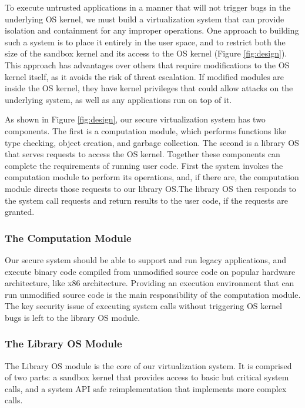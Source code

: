 {To execute untrusted applications in a manner that will not trigger bugs
in the underlying OS kernel, %
we must build a virtualization system that can provide isolation and
containment for any improper operations.
One approach to building such a system is to place it entirely in the user space,
and to restrict both the size of the sandbox kernel and its access to the
OS kernel (Figure \ref{fig:design}).
This approach has advantages over others that require modifications to
the OS kernel itself, as it avoids the risk of threat escalation. If modified modules
are inside the OS kernel, they have kernel privileges that could allow attacks
on the underlying system, as well as any applications run on top of it.

As shown in Figure \ref{fig:design}, our secure virtualization system
has two components.
The first is a computation module, which performs functions like type checking,
object creation, and garbage collection. The second is a library OS that
serves requests to access the OS kernel.
Together these components can complete the requirements of running user code.
First the system invokes the computation module to perform its operations,
and, if there are, the computation module directs those requests to our
library OS.The library OS then responds to the system call requests and
return results to the user code, if the requests are granted.

\subsubsection{The Computation Module}

Our secure system should be able to support and run legacy applications,
and execute binary code compiled from unmodified source code on popular hardware architecture,
like x86 architecture. Providing an execution environment that can run unmodified source code is
the main responsibility of the computation module. The key security issue of executing system calls
without triggering OS kernel bugs is left to the library OS module.

\subsubsection{The Library OS Module}

The Library OS module is the core of our virtualization system. It is comprised
of two parts: a sandbox kernel that provides access to basic but critical
system calls, and a system API safe reimplementation that implements more
complex calls. 

}
